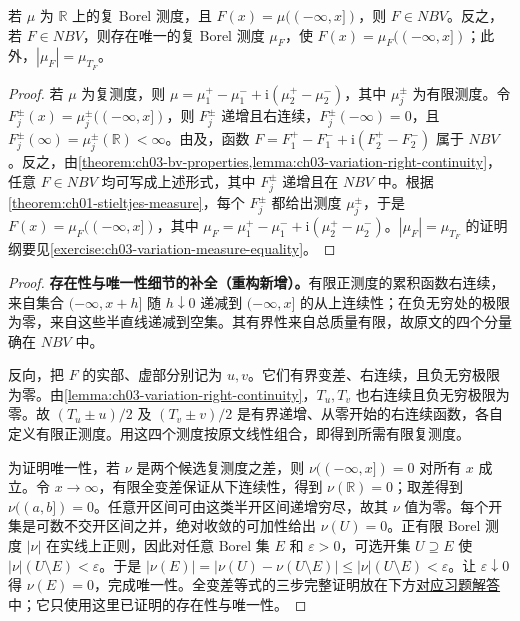\documentclass[../../main.tex]{subfiles}%
\begin{document}
\begin{theorem}\label{theorem:ch03-nbv-measure-correspondence}
若 $\mu$ 为 $\mathbb R$ 上的复 Borel 测度，且 $F(x)=\mu((-\infty,x])$，则 $F\in NBV$。反之，若 $F\in NBV$，则存在唯一的复 Borel 测度 $\mu_F$，使 $F(x)=\mu_F((-\infty,x])$；此外，$|\mu_F|=\mu_{T_F}$。
\end{theorem}
\begin{proof}
若 $\mu$ 为复测度，则 $\mu=\mu_1^+-\mu_1^-+\mathrm i(\mu_2^+-\mu_2^-)$，其中 $\mu_j^\pm$ 为有限测度。令 $F_j^\pm(x)=\mu_j^\pm((-\infty,x])$，则 $F_j^\pm$ 递增且右连续，$F_j^\pm(-\infty)=0$，且 $F_j^\pm(\infty)=\mu_j^\pm(\mathbb R)<\infty$。由及，函数 $F=F_1^+-F_1^-+\mathrm i(F_2^+-F_2^-)$ 属于 $NBV$。反之，由\cref{theorem:ch03-bv-properties,lemma:ch03-variation-right-continuity}，任意 $F\in NBV$ 均可写成上述形式，其中 $F_j^\pm$ 递增且在 $NBV$ 中。根据\cref{theorem:ch01-stieltjes-measure}，每个 $F_j^\pm$ 都给出测度 $\mu_j^\pm$，于是 $F(x)=\mu_F((-\infty,x])$，其中 $\mu_F=\mu_1^+-\mu_1^-+\mathrm i(\mu_2^+-\mu_2^-)$。$|\mu_F|=\mu_{T_F}$ 的证明纲要见\cref{exercise:ch03-variation-measure-equality}。
\end{proof}
\begin{proof}
\textbf{存在性与唯一性细节的补全（重构新增）。}有限正测度的累积函数右连续，来自集合 $(-\infty,x+h]$ 随 $h\downarrow0$ 递减到 $(-\infty,x]$ 的从上连续性；在负无穷处的极限为零，来自这些半直线递减到空集。其有界性来自总质量有限，故原文的四个分量确在 $NBV$ 中。

反向，把 $F$ 的实部、虚部分别记为 $u,v$。它们有界变差、右连续，且负无穷极限为零。由\cref{lemma:ch03-variation-right-continuity}，$T_u,T_v$ 也右连续且负无穷极限为零。故 $(T_u\pm u)/2$ 及 $(T_v\pm v)/2$ 是有界递增、从零开始的右连续函数，各自定义有限正测度。用这四个测度按原文线性组合，即得到所需有限复测度。

为证明唯一性，若 $\nu$ 是两个候选复测度之差，则 $\nu((-\infty,x])=0$ 对所有 $x$ 成立。令 $x\to\infty$，有限全变差保证从下连续性，得到 $\nu(\mathbb R)=0$；取差得到 $\nu((a,b])=0$。任意开区间可由这类半开区间递增穷尽，故其 $\nu$ 值为零。每个开集是可数不交开区间之并，绝对收敛的可加性给出 $\nu(U)=0$。正有限 Borel 测度 $|\nu|$ 在实线上正则，因此对任意 Borel 集 $E$ 和 $\varepsilon>0$，可选开集 $U\supseteq E$ 使 $|\nu|(U\setminus E)<\varepsilon$。于是 $|\nu(E)|=|\nu(U)-\nu(U\setminus E)|\le|\nu|(U\setminus E)<\varepsilon$。让 $\varepsilon\downarrow0$ 得 $\nu(E)=0$，完成唯一性。全变差等式的三步完整证明放在下方\hyperref[solution:ch03-variation-measure-equality]{对应习题解答}中；它只使用这里已证明的存在性与唯一性。
\end{proof}
\end{document}
